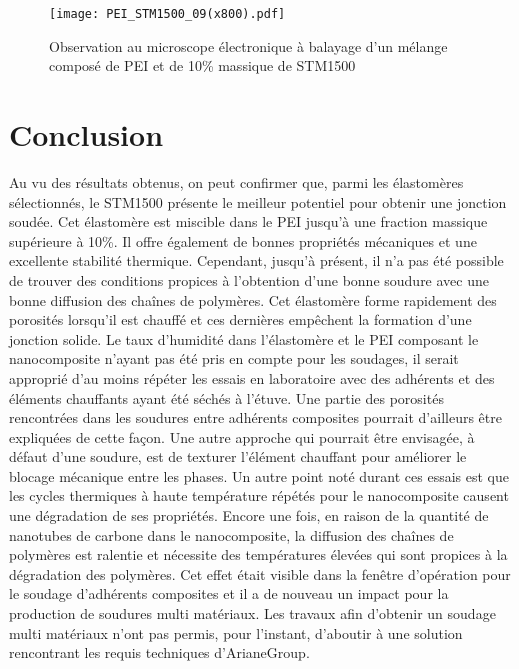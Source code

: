 \begin{figure}[h]
	\centering
	\texttt{[image: PEI\_STM1500\_09(x800).pdf]}
	\caption{Observation au microscope électronique à balayage d'un mélange composé de PEI et de 10\% massique de STM1500}
	\label{fig:SEM_mix_STM1500_PEI}
\end{figure}

\FloatBarrier
\section{Conclusion}

Au vu des résultats obtenus, on peut confirmer que, parmi les élastomères sélectionnés, le STM1500 présente le meilleur potentiel pour obtenir une jonction soudée. 
Cet élastomère est miscible dans le PEI jusqu'à une fraction massique supérieure à 10\%. 
Il offre également de bonnes propriétés mécaniques et une excellente stabilité thermique. 
Cependant, jusqu'à présent, il n'a pas été possible de trouver des conditions propices à l'obtention d'une bonne soudure avec une bonne diffusion des chaînes de polymères. 
Cet élastomère forme rapidement des porosités lorsqu'il est chauffé et ces dernières empêchent la formation d'une jonction solide. 
Le taux d'humidité dans l'élastomère et le PEI composant le nanocomposite n'ayant pas été pris en compte pour les soudages, il serait approprié d'au moins répéter les essais en laboratoire avec des adhérents et des éléments chauffants ayant été séchés à l'étuve. 
Une partie des porosités rencontrées dans les soudures entre adhérents composites pourrait d'ailleurs être expliquées de cette façon. 
Une autre approche qui pourrait être envisagée, à défaut d'une soudure, est de texturer l'élément chauffant pour améliorer le blocage mécanique entre les phases. 
Un autre point noté durant ces essais est que les cycles thermiques à haute température répétés pour le nanocomposite causent une dégradation de ses propriétés. 
Encore une fois, en raison de la quantité de nanotubes de carbone dans le nanocomposite, la diffusion des chaînes de polymères est ralentie et nécessite des températures élevées qui sont propices à la dégradation des polymères. 
Cet effet était visible dans la fenêtre d'opération pour le soudage d'adhérents composites et il a de nouveau un impact pour la production de soudures multi matériaux. 
Les travaux afin d'obtenir un soudage multi matériaux n'ont pas permis, pour l'instant, d'aboutir à une solution rencontrant les requis techniques d'ArianeGroup. 